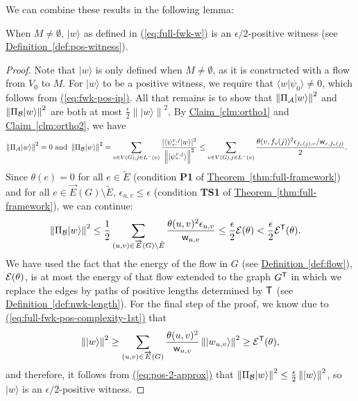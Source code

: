\documentclass{theoretics}
\newcommand{\eq}[1]{\hyperref[eq:#1]{(\ref*{eq:#1})}}
\newcommand{\thm}[1]{\hyperref[thm:#1]{Theorem~\ref*{thm:#1}}}
\newcommand{\defin}[1]{\hyperref[def:#1]{Definition~\ref*{def:#1}}}
\newcommand{\clm}[1]{\hyperref[clm:#1]{Claim~\ref*{clm:#1}}}
\def\ket#1{{\lvert}#1\rangle}
\renewcommand{\>}{\rangle}
\newcommand{\<}{\langle}
\renewcommand{\(}{\left(}
\renewcommand{\)}{\right)}
\def\braket#1#2{{{\langle}#1\vert}#2\rangle}
\def\norm#1{\left\| #1 \right\|}
\def\w{{\sf w}}
\begin{document}
\noindent We can combine these results in the following lemma:
\begin{lemma}\label{lem:full-fwk-pos-2}
When $M\neq\emptyset$, $\ket{w}$ as defined in \eq{full-fwk-w} is an $\epsilon/2$-positive witness (see \defin{pos-witness}).
\end{lemma}
\begin{proof}
Note that $\ket{w}$ is only defined when $M\neq \emptyset$, as it is constructed with a flow from $V_0$ to $M$.
For $\ket{w}$ to be a positive witness, we require that $\braket{w}{\psi_0}\neq 0$, which follows from \eq{fwk-pos-ip}. All that remains is to show that $\norm{\Pi_{\cal A}\ket{w}}^2$ and $\norm{\Pi_{\cal B}\ket{w}}^2$ are both at most $\frac{\epsilon}{2}\norm{\ket{w}}^2$. 
By \clm{ortho1} and \clm{ortho2}, we have 
\begin{align*}
\norm{\Pi_{\cal A}\ket{w}}^2=0
\mbox{ and }
\norm{\Pi_{\cal B}\ket{w}}^2 &= \sum_{v\in V(G),j\in L^-(v)}\frac{|\braket{\psi_{\leftarrow}^{v,j}}{w}|^2}{\norm{\ket{\psi_{\leftarrow}^{v,j}}}^2}
\leq \sum_{v\in V(G),j\in L^-(v)}\frac{\theta(v,f_v(j))^2 \epsilon_{f_v(j),v}/\w_{v,f_v(j)}}{2}.
\end{align*}
Since $\theta(e)=0$ for all $e\in \tilde{E}$ (condition \textbf{P1} of \thm{full-framework}) and for all $e\in \overrightarrow{E}(G)\setminus\tilde{E}$, $\epsilon_{u,v}\leq \epsilon$ (condition \textbf{TS1} of \thm{full-framework}), we can continue:
\begin{align}
\norm{\Pi_{\cal B}\ket{w}}^2 &\leq \frac{1}{2}\sum_{(u,v)\in\overrightarrow{E}(G)\setminus \tilde{E}}\frac{\theta(u,v)^2 \epsilon_{u,v}}{\w_{u,v}}
\leq \frac{\epsilon}{2}{\cal E}(\theta) < \frac{\epsilon}{2}{\cal E}^{\sf T}(\theta). \label{eq:pos-2-approx}
\end{align}
We have used the fact that the energy of the flow in $G$ (see \defin{flow}), ${\cal E}(\theta)$, is at most
the energy of that flow extended to the graph $G^{\sf T}$ in which we replace the edges by paths of positive lengths determined by ${\sf T}$ (see \defin{nwk-length}). For the final step of the proof, we know due to \eq{full-fwk-pos-complexity-1st} that
\begin{align*}
	\norm{\ket{w}}^2 \geq \sum_{(u,v)\in\overrightarrow{E}(G)}\frac{\theta(u,v)^2}{\w_{u,v}}\norm{\ket{w_{u,v}}}^2 \geq {\cal E}^{\sf T}(\theta), 
\end{align*}
and therefore, it follows from \eq{pos-2-approx} that $\norm{\Pi_{\cal B}\ket{w}}^2\leq \frac{\epsilon}{2}\norm{\ket{w}}^2$, so $\ket{w}$ is an $\epsilon/2$-positive witness.
\end{proof}
\end{document}
